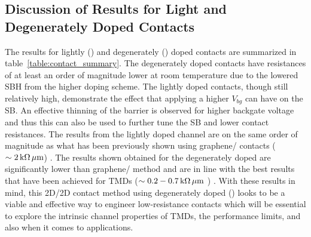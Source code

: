 \subsection{Discussion of Results for Light and Degenerately Doped Contacts}\label{subsec:contact_discussion}
The results for lightly (\lightlyfive) and degenerately (\degenerate) doped  contacts are summarized in table~\ref{table:contact_summary}. The degenerately doped contacts have resistances of at least an order of magnitude lower at room temperature due to the lowered \acs{SBH} from the higher doping scheme. The lightly doped contacts, though still relatively high, demonstrate the effect that applying a higher $V_{bg}$ can have on the \acs{SB}. An effective thinning of the barrier is observed for higher backgate voltage and thus this can also be used to further tune the \acs{SB} and lower contact resistances. The results from the lightly doped  channel are on the same order of magnitude as what has been previously shown using graphene/ contacts ($\sim 2\,\mathrm{k\Omega}\,\mathrm{\mu m}$) \cite{HJ_Chuang_NanoLett2014}. The results shown obtained for the degenerately doped  are significantly lower than graphene/ method and are in line with the best results that have been achieved for \acp{TMD} ($\sim 0.2-0.7\,\mathrm{k\Omega}\,\mathrm{\mu m}$ ) \cite{Yang_NanoLett2014,Kappera_NatureMat2014,Leong_ACSnano2014}. With these results in mind, this 2D/2D contact method using degenerately doped  (\degenerate) looks to be a viable and effective way to engineer low-resistance contacts which will be essential to explore the intrinsic channel properties of \acp{TMD}, the performance limits, and also when it comes to applications.
